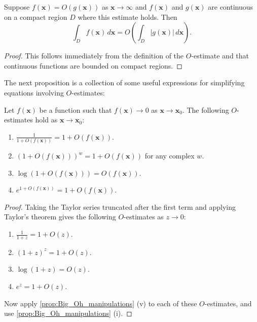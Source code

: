      \begin{proposition}
        Suppose $f(\mathbf{x}) = O(g(\mathbf{x}))$ as $\mathbf{x} \to \infty$ and $f(\mathbf{x})$ and $g(\mathbf{x})$ are continuous on a compact region $D$ where this estimate holds. Then
        \[
          \int_{D}f(\mathbf{x})\,d\mathbf{x} = O\left(\int_{D}|g(\mathbf{x})|\,d\mathbf{x}\right).
        \]
      \end{proposition}
      \begin{proof}
        This follows immediately from the definition of the $O$-estimate and that continuous functions are bounded on compact regions.
      \end{proof}

      The next proposition is a collection of some useful expressions for simplifying equations involving $O$-estimates:

      \begin{proposition}
        Let $f(\mathbf{x})$ be a function such that $f(\mathbf{x}) \to 0$ as $\mathbf{x} \to \mathbf{x}_{0}$. The following $O$-estimates hold as $\mathbf{x} \to \mathbf{x}_{0}$:
        \begin{enumerate}[label*=(\roman*)]
          \item $\frac{1}{1+O(f(\mathbf{x}))} = 1+O(f(\mathbf{x}))$.
          \item $(1+O(f(\mathbf{x})))^{w} = 1+O(f(\mathbf{x}))$ for any complex $w$.
          \item $\log(1+O(f(\mathbf{x}))) = O(f(\mathbf{x}))$.
          \item $e^{1+O(f(\mathbf{x}))} = 1+O(f(\mathbf{x}))$.
        \end{enumerate}
      \end{proposition}
      \begin{proof}
        Taking the Taylor series truncated after the first term and applying Taylor's theorem gives the following $O$-estimates as $z \to 0$:
        \begin{enumerate}[label*=(\roman*)]
          \item $\frac{1}{1+z} = 1+O(z)$.
          \item $(1+z)^{z} = 1+O(z)$.
          \item $\log(1+z) = O(z)$.
          \item $e^{z} = 1+O(z)$.
        \end{enumerate}
        Now apply \cref{prop:Big_Oh_manipulations} (v) to each of these $O$-estimates, and use \cref{prop:Big_Oh_manipulations} (i).
      \end{proof}

